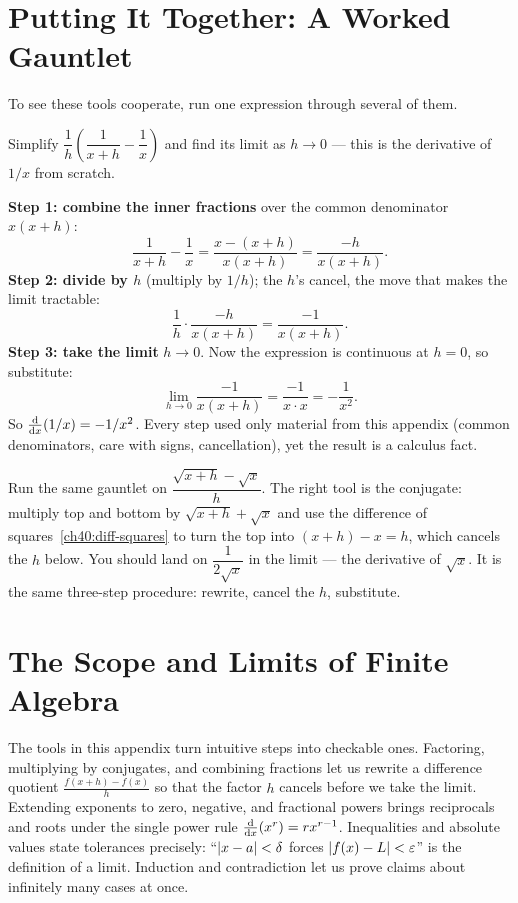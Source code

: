 \section{Putting It Together: A Worked Gauntlet}
\label{ch40:gauntlet}

To see these tools cooperate, run one expression through several of them.

\begin{example}
\label{ch40:ex-gauntlet}
Simplify $\dfrac{1}{h}\!\left(\dfrac{1}{x+h} - \dfrac{1}{x}\right)$ and find its
limit as $h\to 0$ --- this is the derivative of $1/x$ from scratch.

\textbf{Step 1: combine the inner fractions} over the common denominator
$x(x+h)$:
\[
  \frac{1}{x+h} - \frac{1}{x} = \frac{x - (x+h)}{x(x+h)} = \frac{-h}{x(x+h)}.
\]
\textbf{Step 2: divide by $h$} (multiply by $1/h$); the $h$'s cancel, the move
that makes the limit tractable:
\[
  \frac{1}{h}\cdot\frac{-h}{x(x+h)} = \frac{-1}{x(x+h)}.
\]
\textbf{Step 3: take the limit} $h \to 0$. Now the expression is continuous at
$h=0$, so substitute:
\[
  \lim_{h\to 0} \frac{-1}{x(x+h)} = \frac{-1}{x \cdot x} = -\frac{1}{x^2}.
\]
So $\frac{\mathrm{d}}{\mathrm{d} x}\!\left(1/x\right) = -1/x^2$. Every step used only material from this appendix
(common denominators, care with signs, cancellation), yet the result is a
calculus fact.
\end{example}

\begin{labbox}
Run the same gauntlet on $\dfrac{\sqrt{x+h}-\sqrt{x}}{h}$. The right tool is the
conjugate: multiply top and bottom by $\sqrt{x+h}+\sqrt{x}$ and use the difference
of squares~\eqref{ch40:diff-squares} to turn the top into $(x+h)-x = h$, which
cancels the $h$ below. You should land on $\dfrac{1}{2\sqrt x}$ in the limit ---
the derivative of $\sqrt x$. It is the same three-step procedure: rewrite,
cancel the $h$, substitute.
\end{labbox}

\section{The Scope and Limits of Finite Algebra}
\label{ch40:what-next}

The tools in this appendix turn intuitive steps into checkable ones. Factoring,
multiplying by conjugates, and combining fractions let us rewrite a difference
quotient $\frac{f(x+h)-f(x)}{h}$ so that the factor $h$ cancels before we take
the limit. Extending exponents to zero, negative, and fractional powers brings
reciprocals and roots under the single power rule $\frac{\mathrm{d}}{\mathrm{d} x}\!\left(x^r\right) = r x^{r-1}$.
Inequalities and absolute values state tolerances precisely: ``$\lvert x - a\rvert <
\delta$ forces $\lvert f(x) - L\rvert < \varepsilon$'' is the definition of a limit. Induction
and contradiction let us prove claims about infinitely many cases at once.

